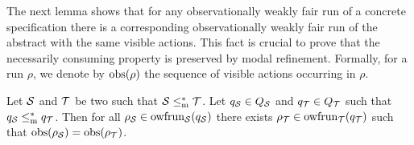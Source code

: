 The next lemma shows that for any observationally weakly fair run of a concrete \MAIOTS specification there is a corresponding observationally weakly fair run of the abstract \MAIOTS with the same visible actions. This fact is crucial to prove that the necessarily consuming property is preserved by modal refinement.
Formally, for a run $\rho$, we denote by $\visiblea(\rho)$ the sequence of visible actions occurring in $\rho$. 

\begin{lemma}\label{lem:corr_run}
Let $\S$ and $\T$ be two \MAIOTSs such that $\S \mrw \T$.
Let $q_\S \in Q_\S$ and $q_\T \in Q_\T$  such that $q_\S \mrw q_\T$.
    Then for all $\rho_\S \in \wfrun{\S}(q_\S)$ there exists $\rho_\T \in \wfrun{\T}(q_\T)$ such that 
    $\visiblea(\rho_\S) = \visiblea(\rho_\T)$.
\end{lemma}
